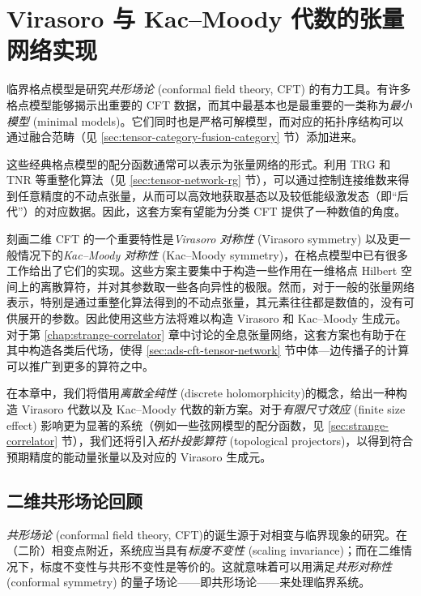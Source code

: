\chapter{Virasoro 与 Kac--Moody 代数的张量网络实现}
\label{chap:virasoro}

临界格点模型是研究\emph{共形场论} (conformal field theory, CFT) 的有力工具。有许多格点模型能够揭示出重要的 CFT 数据，而其中最基本也是最重要的一类称为\emph{最小模型} (minimal models)。它们同时也是严格可解模型，而对应的拓扑序结构可以通过融合范畴（见 \ref{sec:tensor-category-fusion-category} 节）添加进来\cite{aasen2016topological,vanhove2018mapping,aasen2020topological,huang2022numerical,vanhove2022critical}。

这些经典格点模型的配分函数通常可以表示为张量网络的形式。利用 TRG 和 TNR 等重整化算法（见 \ref{sec:tensor-network-rg} 节），可以通过控制连接维数来得到任意精度的不动点张量，从而可以高效地获取基态以及较低能级激发态（即“后代”）的对应数据。因此，这套方案有望能为分类 CFT 提供了一种数值的角度。

刻画二维 CFT 的一个重要特性是\emph{Virasoro 对称性} (Virasoro symmetry) 以及更一般情况下的\emph{Kac--Moody 对称性} (Kac--Moody symmetry)，在格点模型中已有很多工作给出了它们的实现\cite{pasquier1990common,koo1994representations,milsted2017extraction,zou2018conformal,hongler2022conformal,wang2022emergence}。这些方案主要集中于构造一些作用在一维格点 Hilbert 空间上的离散算符，并对其参数取一些各向异性的极限。然而，对于一般的张量网络表示，特别是通过重整化算法得到的不动点张量，其元素往往都是数值的，没有可供展开的参数。因此使用这些方法将难以构造 Virasoro 和 Kac--Moody 生成元。对于第 \ref{chap:strange-correlator} 章中讨论的全息张量网络，这套方案也有助于在其中构造各类后代场，使得 \ref{sec:ads-cft-tensor-network} 节中体—边传播子的计算可以推广到更多的算符之中。

在本章中，我们将借用\emph{离散全纯性} (discrete holomorphicity)\cite{cardy2009discrete}的概念，给出一种构造 Virasoro 代数以及 Kac--Moody 代数的新方案\cite{wang2022virasoro,zeng2023virasoro}。对于\emph{有限尺寸效应} (finite size effect) 影响更为显著的系统（例如一些弦网模型的配分函数，见 \ref{sec:strange-correlator} 节），我们还将引入\emph{拓扑投影算符} (topological projectors)，以得到符合预期精度的能动量张量以及对应的 Virasoro 生成元。

\section{二维共形场论回顾}
\label{sec:cft-review}

\emph{共形场论} (conformal field theory, CFT)\cite{belavin1984infinite,ginsparg1988applied,francesco2012conformal}的诞生源于对相变与临界现象的研究。在（二阶）相变点附近，系统应当具有\emph{标度不变性} (scaling invariance)；而在二维情况下，标度不变性与共形不变性是等价的。这就意味着可以用满足\emph{共形对称性} (conformal symmetry) 的量子场论——即共形场论——来处理临界系统。

